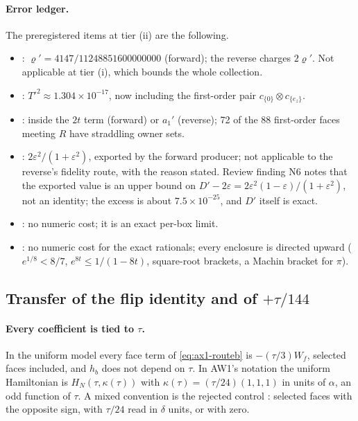 \paragraph{Error ledger.}
The preregistered items at tier (ii) are the following.
\begin{itemize}
\item {}: $\varrho'=4147/11248851600000000$ (forward); the
reverse charges $2\varrho'$. Not applicable at tier (i), which bounds the
whole collection.
\item {}: $T'^2\approx1.304\times10^{-17}$, now including
the first-order pair $c_{\{0\}}\otimes c_{\{e_z\}}$.
\item {}: inside the $2t$ term (forward) or $a_1'$ (reverse);
72 of the 88 first-order faces meeting $R$ have straddling owner sets.
\item {}: $2\varepsilon^2/(1+\varepsilon^2)$, exported by the
forward producer; not applicable to the reverse's fidelity route, with the
reason stated. Review finding N6 notes that the exported value is an upper
bound on $D'-2\varepsilon=2\varepsilon^2(1-\varepsilon)/(1+\varepsilon^2)$,
not an identity; the excess is about $7.5\times10^{-25}$, and $D'$ itself is
exact.
\item {}: no numeric cost; it is an exact per-box
limit.
\item {}: no numeric cost for the exact rationals; every
enclosure is directed upward ($e^{1/8}<8/7$, $e^{8t}\le1/(1-8t)$,
square-root brackets, a Machin bracket for $\pi$).
\end{itemize}

\subsection{Transfer of the flip identity and of \texorpdfstring{$+\tau/144$}{+tau/144}}
\label{sec:ax1-transfer}
\paragraph{Every coefficient is tied to $\tau$.}
In the uniform model every face term of \eqref{eq:ax1-routeb} is
$-(\tau/3)W_f$, selected faces included, and $h_b$ does not depend on $\tau$.
In AW1's notation the uniform Hamiltonian is $H_N(\tau,\kappa(\tau))$ with
$\kappa(\tau)=(\tau/24)(1,1,1)$ in units of $\alpha$, an odd function of
$\tau$. A mixed convention is the rejected control
: selected faces with the opposite sign, with
$\tau/24$ read in $\delta$ units, or with zero.

